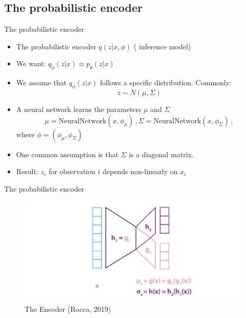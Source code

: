 \documentclass[10pt]{beamer}
\begin{document}
\subsection{The probabilistic encoder}

\begin{frame}{The probabilistic encoder}

\begin{itemize}
\item The probabilistic encoder $q(z|x, \phi)$ ({\color{uured} inference model})
\item We want: $q_\phi(z|x) \approx p_\theta(z|x)$
\pause
\item We assume that $q_\phi(z|x)$ follows a specific distribution. Commonly:
\[
z \sim N(\mu, \Sigma)
\]
\item A neural network learns the parameters $\mu$ and $\Sigma$
\[
\mu = \text{NeuralNetwork}(x,\phi_\mu)\,, \Sigma = \text{NeuralNetwork}(x,\phi_\Sigma)\,,
\]
where $\phi = (\phi_\mu, \phi_\Sigma)$
\pause
\item One common assumption is that $\Sigma$ is a diagonal matrix.
\item {\color{uured} Result}: $z_i$ for observation $i$ depends non-linearly on $x_i$
\end{itemize}

\end{frame}

\begin{frame}{The probabilistic encoder}

\begin{figure}[h]
\centering
\includegraphics[width=1\textwidth]{fig/Rocca_VAE_encoder.png}
\caption{The Encoder (Rocca, 2019)}
\end{figure}

\end{frame}
\end{document}
